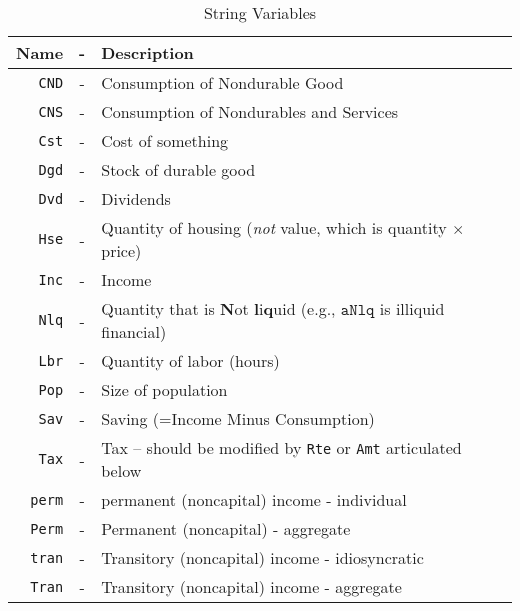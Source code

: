 \documentclass[12pt]{\econtex}
\begin{document}
\hypertarget{Standard-Variable-Names}{}
\begin{table}[ht]
  \centering
  \begin{tabular}{|rcl|}
    \hline
    Name & - & Description 
    \\ \hline
    \texttt{CND}    & - & Consumption of Nondurable Good 
    \\   \texttt{CNS}    & - & Consumption of Nondurables and Services
    \\  \texttt{Cst}    & - & Cost of something 
    \\  \texttt{Dgd}    & - & Stock of durable good
    \\  \texttt{Dvd}    & - & Dividends 
    \\  \texttt{Hse}    & - & Quantity of housing (\textit{not} value, which is quantity $\times$ price)
    \\  \texttt{Inc}    & - & Income
    \\  \texttt{Nlq}    & - & Quantity that is \textbf{N}ot \textbf{l}i\textbf{q}uid (e.g., $\mathtt{aNlq}$ is illiquid financial)
    \\  \texttt{Lbr}    & - & Quantity of labor (hours)
    \\  \texttt{Pop}    & - & Size of population
    \\  \texttt{Sav}    & - & Saving (=Income Minus Consumption)
    \\  \texttt{Tax}    & - & Tax -- should be modified by \texttt{Rte} or \texttt{Amt} articulated below
    \\  \texttt{perm}   & - & permanent (noncapital) income - individual
    \\  \texttt{Perm}   & - & Permanent (noncapital) - aggregate
    \\  \texttt{tran}   & - & Transitory (noncapital) income - idiosyncratic
    \\  \texttt{Tran}   & - & Transitory (noncapital) income - aggregate
    \\ \hline
  \end{tabular}
  \caption{String Variables}
  \label{table:Standard-Variable-Names}
\end{table}
\end{document}
